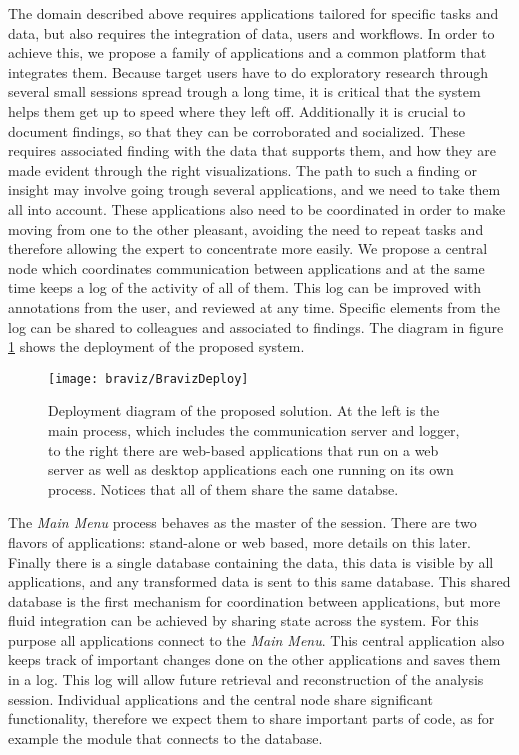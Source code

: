 The domain described above requires applications tailored for specific tasks and data, but also requires the integration of data, users and workflows. In order to achieve this, we propose a family of applications and a common platform that integrates them. Because target users have to do exploratory research through several small sessions spread trough a long time, it is critical that the system helps them get up to speed where they left off. Additionally it is crucial to document findings, so that they can be corroborated and socialized. These requires associated finding with the data that supports them, and how they are made evident through the right visualizations. The path to such a finding or insight may involve going trough several applications, and we need to take them all into account. These applications also need to be coordinated in order to make moving from one to the other pleasant, avoiding the need to repeat tasks and therefore allowing the expert to concentrate more easily. We propose a central node which coordinates communication between applications and at the same time keeps a log of the activity of all of them. This log can be improved with annotations from the user, and reviewed at any time. Specific elements from the log can be shared to colleagues and associated to findings. The diagram in figure \ref{fig_deployment} shows the deployment of the proposed system.

\begin{figure}
\centering
\texttt{[image: braviz/BravizDeploy]}
\caption{\label{fig_deployment} Deployment diagram of the proposed solution. At the left is the main process, which includes the communication server and logger, to the right there are web-based applications that run on a web server as well as desktop applications each one running on its own process. Notices that all of them share the same databse.}
\end{figure}

The \emph{Main Menu} process behaves as the master of the session. There are two flavors of applications: stand-alone or web based, more details on this later. Finally there is a single database containing the data, this data is visible by all applications, and any transformed data is sent to this same database. This shared database is the first mechanism for coordination between applications, but more fluid integration can be achieved by sharing state across the system. For this purpose all applications connect to the \emph{Main Menu}. This central application also keeps track of important changes done on the other applications and saves them in a log. This log will allow future retrieval and reconstruction of the analysis session. Individual applications and the central node share significant functionality, therefore we expect them to share important parts of code, as for example the module that connects to the database.
 
